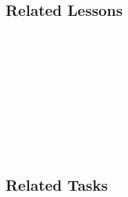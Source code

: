 \subsection{Related Lessons}
\fourbOne{}\\
\fourgFour{}\\
\fourgFive{}\\
\fouriOne{}\\
\fouriTwo{}\\
\fourkTwo{}\\
\fourFKOne{}\\
\fourFKThree{}\\
\fourFKSeven{}\\
%
\subsection{Related Tasks}
\fourbOne{}\\
\fourgFour{}\\
\fourgFive{}\\
\fourFKOne{}\\
\fourFKSeven{}\\
\fourFKEight{}\\

